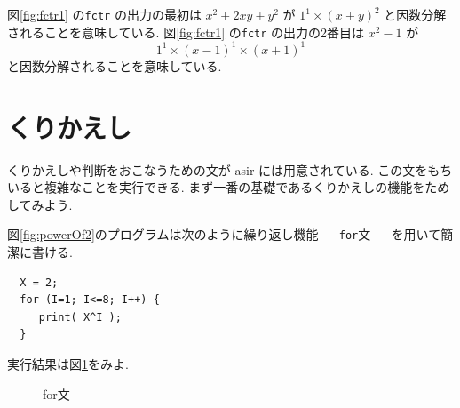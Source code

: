\documentclass{jbook}
\begin{document}
図\ref{fig:fctr1} の{\tt fctr} の出力の最初は $x^2+2xy+y^2$ が 
$ 1^1 \times (x+y)^2 $ 
と因数分解されることを意味している. 
図\ref{fig:fctr1} の{\tt fctr} の出力の2番目は $x^2-1$ が 
$$ 1^1 \times (x-1)^1 \times (x+1)^1 
$$ 
と因数分解されることを意味している. 


\section{くりかえし}

くりかえしや判断をおこなうための文が asir には用意されている.
この文をもちいると複雑なことを実行できる.
まず一番の基礎であるくりかえしの機能をためしてみよう.
 
\begin{example} \rm
図\ref{fig:powerOf2}のプログラムは次のように繰り返し機能 --- {\tt for}文 ---
を用いて簡潔に書ける.
\begin{screen}
\begin{verbatim}
  X = 2;
  for (I=1; I<=8; I++) {
     print( X^I );
  }
\end{verbatim}
\end{screen}
実行結果は図\ref{fig:powerOf2For}をみよ.
\end{example}

\begin{figure}[tbh]
\begin{center}
\end{center}
\caption{for文} \label{fig:powerOf2For}
\end{figure}
\end{document}
